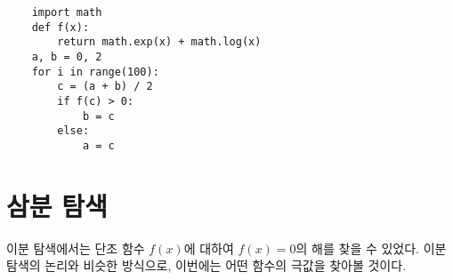 \begin{verbatim}
	import math
	def f(x):
		return math.exp(x) + math.log(x)
	a, b = 0, 2
	for i in range(100):
		c = (a + b) / 2
		if f(c) > 0:
			b = c
		else:
			a = c
\end{verbatim}

\section{삼분 탐색}
이분 탐색에서는 단조 함수 $f(x)$에 대하여 $f(x) = 0$의 해를 찾을 수 있었다. 이분 탐색의 논리와 비슷한 방식으로, 이번에는 어떤 함수의 극값을 찾아볼 것이다.